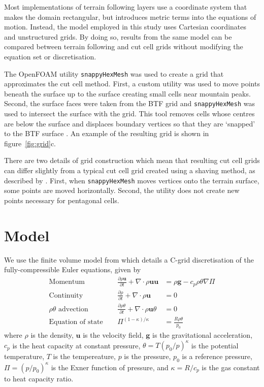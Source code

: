 \documentclass[twocol]{ametsoc}
\begin{document}
Most implementations of terrain following layers use a coordinate system that makes the domain rectangular, but introduces metric terms into the equations of motion.  Instead, the model employed in this study uses Cartesian coordinates and unstructured grids.  By doing so, results from the same model can be compared between terrain following and cut cell grids without modifying the equation set or discretisation.

The OpenFOAM utility \texttt{snappyHexMesh} was used to create a grid that approximates the cut cell method.  First, a custom utility was used to move points beneath the surface up to the surface creating small cells near mountain peaks.  Second, the surface faces were taken from the BTF grid and \texttt{snappyHexMesh} was used to intersect the surface with the grid.  This tool removes cells whose centres are below the surface and displaces boundary vertices so that they are `snapped' to the BTF surface \citep{openfoam2015}.  An example of the resulting grid is shown in figure~\ref{fig:grid}c.

There are two details of grid construction which mean that resulting cut cell grids can differ slightly from a typical cut cell grid created using a shaving method, as described by \citet{adcroft1997}.  First, when \texttt{snappyHexMesh} moves vertices onto the terrain surface, some points are moved horizontally.  Second, the utility does not create new points necessary for pentagonal cells.


\section{Model}
\label{sec:model}

We use the finite volume model from \citet{weller-shahrokhi2014} which details a C-grid discretisation of the fully-compressible Euler equations, given by
\begin{subequations}
\begin{align}
	\text{Momentum} &\ &\  	\frac{\partial \rho \bm{u}}{\partial t} + \nabla \cdot \rho \bm{uu} &= \rho \bm{g} - c_p \rho \theta \nabla \Pi \label{eq:momentum} \\
	\text{Continuity} &\ &\	\frac{\partial \rho}{\partial t} + \nabla \cdot \rho \bm{u} &= 0 \\
	\text{\(\rho \theta\) advection} &\ &\ \frac{\partial \rho \theta}{\partial t} + \nabla \cdot \rho \bm{u} \theta &= 0 \\
	\text{Equation of state} &\ &\ \Pi^{(1 - \kappa)/\kappa} &= \frac{R \rho \theta}{p_0}
\end{align}
\end{subequations}
where \(\rho\) is the density, \(\bm{u}\) is the velocity field, \(\bm{g}\) is the gravitational acceleration, \(c_p\) is the heat capacity at constant pressure, \(\theta = T \left(p_0/p\right)^\kappa\) is the potential temperature, \(T\) is the tempereature, \(p\) is the pressure, \(p_0\) is a reference pressure, \(\Pi = \left(p / p_0 \right)^\kappa\) is the Exner function of pressure, and \(\kappa = R/c_p\) is the gas constant to heat capacity ratio.
\end{document}
